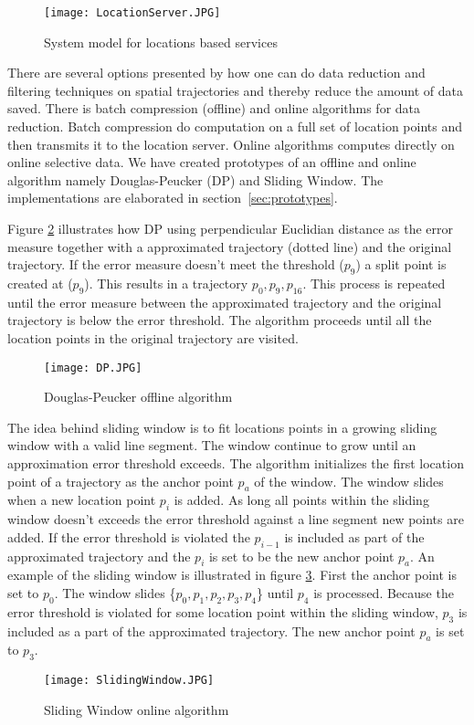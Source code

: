 \begin{figure}[H]
\centering
\texttt{[image: LocationServer.JPG]}

\caption{System model for locations based services}
\label{fig:system_model_for_locations_based_services}
\end{figure}


There are several options presented by \cite{Lee2011} how one can do data reduction and filtering techniques on spatial trajectories and thereby reduce the amount of data saved. There is batch compression (offline) and online algorithms for data reduction. Batch compression do computation on a full set of location points and then transmits it to the location server. Online algorithms computes directly on online selective data. We have created prototypes  of an offline and online algorithm namely Douglas-Peucker (DP) and Sliding Window. The implementations are elaborated in section~\ref{sec:prototypes}. 

Figure \ref{fig:douglas_peucker_algorithm} illustrates how DP using perpendicular Euclidian distance as the error measure together with a approximated trajectory (dotted line) and the original trajectory. If the error measure doesn't meet the threshold ($p_9$) a split point is created at ($p_9$). This results in a trajectory $p_0,p_9,p_{16}$. This process is repeated until the error measure between the approximated trajectory and the original trajectory is below the error threshold. The algorithm proceeds until all the location points in the original trajectory are visited.   

\begin{figure}[H]
\centering
\texttt{[image: DP.JPG]}
\caption{Douglas-Peucker offline algorithm}
\label{fig:douglas_peucker_algorithm}
\end{figure}


The idea behind sliding window is to fit locations points in a growing sliding window with a valid line segment. The window continue to grow until an approximation error threshold exceeds. The algorithm initializes the first location point of a trajectory as the anchor point $p_a$ of the window. The window slides when a new location point $p_i$ is added. As long all points within the sliding window doesn't exceeds the error threshold against a line segment new points are added. If the error threshold is violated the $p_{i-1}$ is included as part of the approximated trajectory and the $p_i$ is set to be the new anchor point $p_a$. An example of the sliding window is illustrated in figure \ref{fig:sliding_window_algorithm}. First the anchor point is set to $p_0$. The window slides \{$p_0,p_1,p_2,p_3,p_4$\} until $p_4$ is processed. Because the error threshold is violated for some location point within the sliding window, $p_3$ is included as a part of the approximated trajectory. The new anchor point $p_a$ is set to $p_3$.       
\begin{figure}[H]
\centering
\texttt{[image: SlidingWindow.JPG]}

\caption{Sliding Window online algorithm}
\label{fig:sliding_window_algorithm}
\end{figure}


